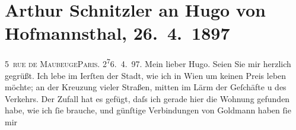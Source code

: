 

         
         \renewcommand{\erwaehntePersonen}{Personen: Maurice Donnay, Paul Goldmann, Gustave Guiches, Abel Hermant, Paul Ernest Hervieu, Hugo von Hofmannsthal, Hugo August von Hofmannsthal, Anna von Hofmannsthal, Ferdinand Raimund, Marie Reinhard}
         \renewcommand{\erwaehnteOrte}{Orte: Paris, Wien, rue de Maubeuge}
         \renewcommand{\erwaehnteWerke}{Werke: Der Alpenkönig und der Menschenfeind, La Carrière, La Douloureuse, Männerrecht, Snob}
               \section[Arthur Schnitzler an Hugo von Hofmannsthal, 26. 4. 1897]{ Arthur Schnitzler an Hugo von Hofmannsthal, 26. 4. 1897}\nopagebreak{}\rehead{ }\begin{ledgroupsized}[t]{13cm}\normalsize\beginnumbering{} \toendnotes[C]{\smallbreak\pagebreak[2]} 
\toendnotes[C]{\smallbreak}\pstart
           \raggedleft{}{\pb}5 \textsc{rue \introOben{}de\introOben{} Maubeuge}\textsc{Paris}. 2\substVorne{}\textsuperscript{7}\substDazwischen{}6\substHinten{}. 4. 97.\pend
           \pstart
           Mein lieber Hugo. Seien Sie mir herzlich gegrüßt. Ich lebe im I{\geminationn}erſten der Stadt, wie ich in Wien um keinen Preis leben möchte; an der Kreuzung vieler
               Straßen, mitten im Lärm der Geſchäfte u des Verkehrs. Der Zufall hat es gefügt, daſs
               ich gerade hier die Wohnung gefunden habe, wie ich ſie brauche, und günſtige
               Verbindungen von Goldmann haben ſie mir

\end{ledgroupsized}
